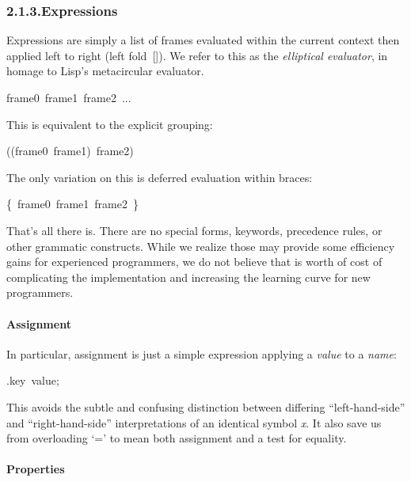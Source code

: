 \documentclass[preprint]{{sigplanconf}}
\begin{document}
\subsubsection{2.1.3.\hspace*{0.5em}Expressions}\label{sec-expressions}%

\noindent Expressions are simply a list of frames evaluated within the current
context then applied left to right (left fold~{}[]). We refer to
this as the \emph{elliptical evaluator}, in homage to Lisp's metacircular
evaluator.%
\begin{mdpre}%
\noindent{}frame0~frame1~frame2~...%
\end{mdpre}\noindent This is equivalent to the explicit grouping:
\begin{mdpre}%
\noindent{}((frame0~frame1)~frame2)%
\end{mdpre}\noindent The only variation on this is deferred evaluation within braces:
\begin{mdpre}%
\noindent{}\{~frame0~frame1~frame2~\}%
\end{mdpre}\noindent That's all there is. There are no special forms, keywords, precedence rules, or
other grammatic constructs. While we realize those may provide some
efficiency gains for experienced programmers, we do not believe that is 
worth of cost of complicating the implementation and increasing the
learning curve for new programmers.

\paragraph{Assignment}\label{sec-assignment}%

\noindent In particular, assignment is just a simple expression applying a \emph{value} to a \emph{name}:%
\begin{mdpre}%
\noindent{}.key~value;%
\end{mdpre}\noindent This avoids the subtle and confusing distinction between differing
\textquotedblleft{}left-hand-side\textquotedblright{} and \textquotedblleft{}right-hand-side\textquotedblright{} interpretations of an identical symbol \emph{x}.
It also save us from overloading \textquoteleft{}=\textquoteright{} to mean both assignment and a test for equality.

\paragraph{Properties}\label{sec-properties}%
\end{document}
